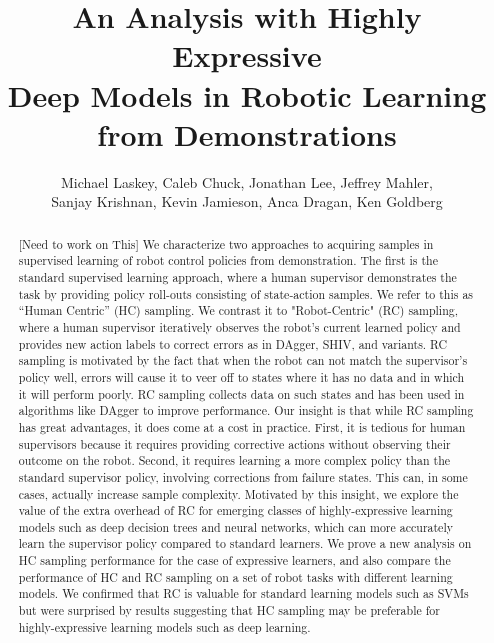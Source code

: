 \documentclass[10pt, conference]{ieeeconf}      %
\title{An Analysis with Highly Expressive  \\
Deep Models in  Robotic Learning from Demonstrations}
\author{Michael Laskey, Caleb Chuck, Jonathan Lee, Jeffrey Mahler,\\ Sanjay Krishnan, Kevin Jamieson, Anca Dragan, Ken Goldberg}
\begin{document}
\maketitle
\thispagestyle{empty}
\pagestyle{empty}







\begin{abstract}
[Need to work on This]
We characterize two approaches to acquiring samples in supervised learning of robot control policies from demonstration. The first is the standard supervised learning approach, where a human supervisor demonstrates the task by providing policy roll-outs consisting of state-action samples. We refer to this as “Human Centric” (HC) sampling. We contrast it to "Robot-Centric" (RC) sampling, where a human supervisor iteratively observes the robot’s current learned policy and provides new action labels to correct errors as in DAgger, SHIV, and variants.  RC sampling is motivated by the fact that when the robot can not match the supervisor’s policy well, errors will cause it to veer off to states where it has no data and in which it will perform poorly. RC sampling collects data on such states and has been used in algorithms like DAgger to improve performance. Our insight is that while RC sampling has great advantages, it does come at a cost in practice. First, it is tedious for human supervisors because it requires providing corrective actions without observing their outcome on the robot. Second, it requires learning a more complex policy than the standard supervisor policy, involving corrections from failure states. This can, in some cases, actually increase sample complexity.  Motivated by this insight, we explore the value of the extra overhead of RC for emerging classes of highly-expressive learning models such as deep decision trees and neural networks, which can more accurately learn the supervisor policy compared to standard learners.  We prove a new analysis on HC sampling performance for the case of expressive learners, and also compare the performance of HC and RC sampling on a set of robot tasks with different learning models.  We confirmed that RC is valuable for standard learning models such as SVMs but were surprised by results suggesting that HC sampling may be preferable for highly-expressive learning models such as deep learning.

 \end{abstract}
\end{document}
